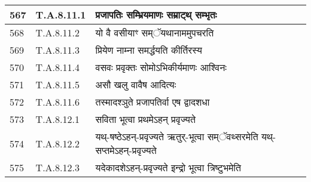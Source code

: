 \documentclass[17pt]{extarticle}
\begin{document}
\begin{longtable}{||p{0.4in}||p{0.9in}||p{4.0in}||p{0.9in}||}
        \hline
            567 & T.A.8.11.1 & प्रजापतिः सम्भ्रियमाणः सम्राट्थ् सम्भृतः &      \\
        \hline
            568 & T.A.8.11.2 & यो वै वसीयाꣳ सम्ॅयथानाममुपचरति &      \\
        \hline
            569 & T.A.8.11.3 & प्रियेण नाम्ना समर्द्धयति कीर्तिरस्य &      \\
        \hline
            570 & T.A.8.11.4 & वसवः प्रवृक्तः सोमोऽभिकीर्यमाणः आश्विनः &      \\
        \hline
            571 & T.A.8.11.5 & असौ खलु वावैष आदित्यः &      \\
        \hline
            572 & T.A.8.11.6 & तस्मादश्ञुते प्रजापतिर्वा एष द्वादशधा &      \\
        \hline
            573 & T.A.8.12.1 & सविता भूत्वा प्रथमेऽहन् प्रवृज्यते &      \\
        \hline
            574 & T.A.8.12.2 & यथ्{-}षष्ठेऽहन्{-}प्रवृज्यते ऋतुर्{-}भूत्वा सम्ॅवथ्सरमेति यथ्{-}सप्तमेऽहन्{-}प्रवृज्यते &      \\
        \hline
            575 & T.A.8.12.3 & यदेकादशेऽहन्{-}प्रवृज्यते इन्द्रो भूत्वा त्रिष्टुभमेति &      \\
        \hline
        \bottomrule
  \end{longtable}
  
\end{document}
